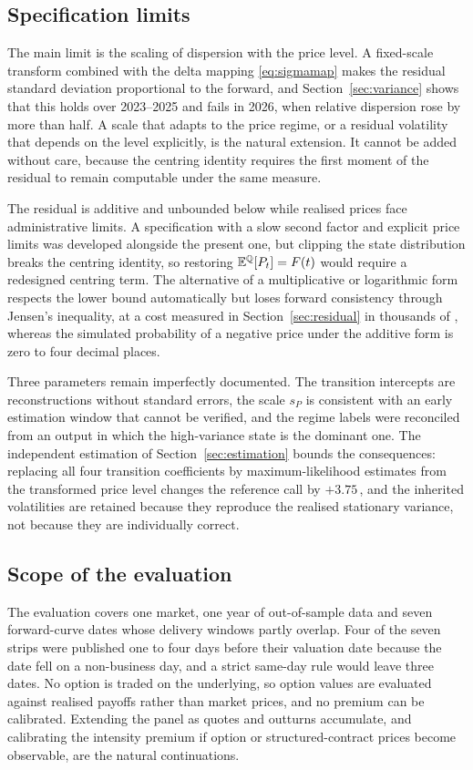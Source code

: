 \subsection{Specification limits}

The main limit is the scaling of dispersion with the price level. A
fixed-scale transform combined with the delta mapping \eqref{eq:sigmamap}
makes the residual standard deviation proportional to the forward, and
Section~\ref{sec:variance} shows that this holds over 2023--2025 and fails in
2026, when relative dispersion rose by more than half. A scale that adapts to
the price regime, or a residual volatility that depends on the level
explicitly, is the natural extension. It cannot be added without care, because
the centring identity requires the first moment of the residual to remain
computable under the same measure.

The residual is additive and unbounded below while realised prices face
administrative limits. A specification with a slow second factor and explicit
price limits was developed alongside the present one, but clipping the state
distribution breaks the centring identity, so restoring
$\mathbb{E}^{\mathbb{Q}}[P_t]=F(t)$ would require a redesigned centring term. The alternative
of a multiplicative or logarithmic form respects the lower bound automatically
but loses forward consistency through Jensen's inequality, at a cost measured
in Section~\ref{sec:residual} in thousands of \TRY, whereas the simulated
probability of a negative price under the additive form is zero to four
decimal places.

Three parameters remain imperfectly documented. The transition intercepts are
reconstructions without standard errors, the scale $s_P$ is consistent with an
early estimation window that cannot be verified, and the regime labels were
reconciled from an output in which the high-variance state is the dominant one.
The independent estimation of Section~\ref{sec:estimation} bounds the
consequences: replacing all four transition coefficients by
maximum-likelihood estimates from the transformed price level changes the
reference call by $+3.75$\,\TRY, and the inherited volatilities
are retained because they reproduce the realised stationary variance, not
because they are individually correct.

\subsection{Scope of the evaluation}

The evaluation covers one market, one year of out-of-sample data and seven
forward-curve dates whose delivery windows partly overlap. Four of the seven
strips were published one to four days before their valuation date because
the date fell on a non-business day, and a strict same-day rule would leave
three dates. No option is traded on the underlying, so option values are
evaluated against realised payoffs rather than market prices, and no premium
can be calibrated. Extending the panel as quotes and outturns accumulate, and
calibrating the intensity premium if option or structured-contract prices
become observable, are the natural continuations.
